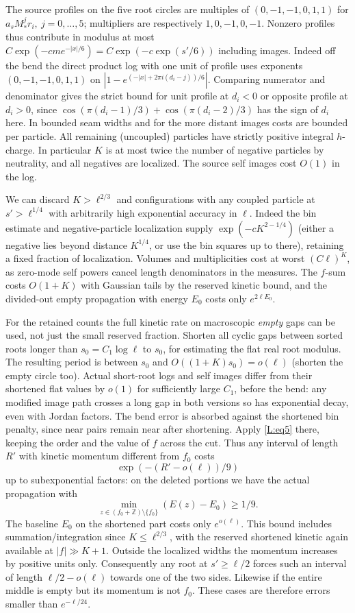 \documentclass[11pt]{article}
\numberwithin{equation}{section}
\theoremstyle{definition}\newtheorem{definition}[theorem]{Definition}
\theoremstyle{remark}\newtheorem{remark}[theorem]{Remark}
\begin{document}
The source profiles on the five root circles are multiples of \((0,-1,-1,0,1,1)\) for \(a_s M_*^j r_i,\ j=0,\ldots,5\); multipliers are respectively \(1,0,-1,0,-1\). Nonzero profiles thus contribute in modulus at most \(C\exp(-c m e^{-|x|/6})=C\exp(-c\exp(s'/6))\) including images. Indeed off the bend the direct product log with one unit of profile uses exponents \((0,-1,-1,0,1,1)\) on \(\left|1-e^{(-|x|+2\pi i(d_i-j))/6}\right|\). Comparing numerator and denominator gives the strict bound for unit profile at \(d_i<0\) or opposite profile at \(d_i>0\), since \(\cos(\pi(d_i-1)/3)+\cos(\pi(d_i-2)/3)\) has the sign of \(d_i\) here. In bounded seam widths and for the more distant images costs are bounded per particle. All remaining (uncoupled) particles have strictly positive integral \(h\)-charge. In particular \(K\) is at most twice the number of negative particles by neutrality, and all negatives are localized. The source self images cost \(O(1)\) in the log.

We can discard \(K>\ell^{2/3}\) and configurations with any coupled particle at \(s'>\ell^{1/4}\) with arbitrarily high exponential accuracy in \(\ell\). Indeed the bin estimate and negative-particle localization supply \(\exp(-c K^{2-1/4})\) (either a negative lies beyond distance \(K^{1/4}\), or use the bin squares up to there), retaining a fixed fraction of localization. Volumes and multiplicities cost at worst \((C\ell)^K\), as zero-mode self powers cancel length denominators in the measures. The \(f\)-sum costs \(O(1+K)\) with Gaussian tails by the reserved kinetic bound, and the divided-out empty propagation with energy \(E_0\) costs only \(e^{2\ell E_0}\).

For the retained counts the full kinetic rate on macroscopic \emph{empty} gaps can be used, not just the small reserved fraction. Shorten all cyclic gaps between sorted roots longer than \(s_0=C_1\log\ell\) to \(s_0\), for estimating the flat real root modulus. The resulting period is between \(s_0\) and \(O((1+K)s_0)=o(\ell)\) (shorten the empty circle too). Actual short-root logs and self images differ from their shortened flat values by \(o(1)\) for sufficiently large \(C_1\), before the bend: any modified image path crosses a long gap in both versions so has exponential decay, even with Jordan factors. The bend error is absorbed against the shortened bin penalty, since near pairs remain near after shortening. Apply \eqref{L:eq5} there, keeping the order and the value of \(f\) across the cut. Thus any interval of length \(R'\) with kinetic momentum different from \(f_0\) costs
\[
 \exp(-(R'-o(\ell))/9)
\]
up to subexponential factors: on the deleted portions we have the actual propagation with \[\min_{z\in(f_0+\mathbb Z)\setminus\{f_0\}} (E(z)-E_0)\ge1/9.\] The baseline \(E_0\) on the shortened part costs only \(e^{o(\ell)}\). This bound includes summation/integration since \(K\le\ell^{2/3}\), with the reserved shortened kinetic again available at \(|f|\gg K+1\). Outside the localized widths the momentum increases by positive units only. Consequently any root at \(s'\ge\ell/2\) forces such an interval of length \(\ell/2-o(\ell)\) towards one of the two sides. Likewise if the entire middle is empty but its momentum is not \(f_0\). These cases are therefore errors smaller than \(e^{-\ell/24}\).
\end{document}
